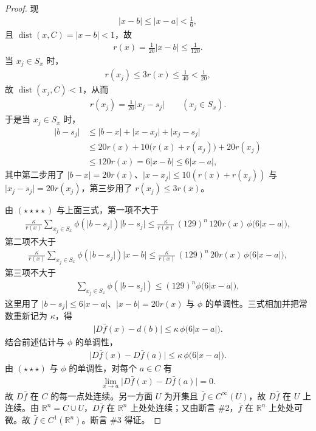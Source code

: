 \documentclass[../../main.tex]{subfiles}%
\begin{document}
\begin{proof}
现
\begin{align*}
\lvert x-b\rvert\leqslant\lvert x-a\rvert<\frac{1}{6},
\end{align*}
且 $\operatorname{dist}(x,C)=\lvert x-b\rvert<1$，故
\begin{align*}
r(x)=\frac{1}{20}\lvert x-b\rvert\leqslant\frac{1}{120}.
\end{align*}
当 $x_j\in S_x$ 时，
\begin{align*}
r(x_j)\leqslant3r(x)\leqslant\frac{1}{40}<\frac{1}{20},
\end{align*}
故 $\operatorname{dist}(x_j,C)<1$，从而
\begin{align*}
r(x_j)=\frac{1}{20}\lvert x_j-s_j\rvert\qquad(x_j\in S_x).
\end{align*}
于是当 $x_j\in S_x$ 时，
\begin{align*}
\lvert b-s_j\rvert&\leqslant\lvert b-x\rvert+\lvert x-x_j\rvert+\lvert x_j-s_j\rvert\\
&\leqslant20r(x)+10\bigl(r(x)+r(x_j)\bigr)+20r(x_j)\\
&\leqslant120r(x)=6\lvert x-b\rvert\leqslant6\lvert x-a\rvert,
\end{align*}
其中第二步用了 $\lvert b-x\rvert=20r(x)$、$\lvert x-x_j\rvert\leqslant10(r(x)+r(x_j))$ 与 $\lvert x_j-s_j\rvert=20r(x_j)$，第三步用了 $r(x_j)\leqslant3r(x)$。

由 $(\star\star\star\star)$ 与上面三式，第一项不大于
\begin{align*}
\frac{\kappa}{r(x)}\sum_{x_j\in S_x}\phi(\lvert b-s_j\rvert)\lvert b-s_j\rvert\leqslant\frac{\kappa}{r(x)}\,(129)^n\,120r(x)\,\phi\bigl(6\lvert x-a\rvert\bigr),
\end{align*}
第二项不大于
\begin{align*}
\frac{\kappa}{r(x)}\sum_{x_j\in S_x}\phi(\lvert b-s_j\rvert)\lvert x-b\rvert\leqslant\frac{\kappa}{r(x)}\,(129)^n\,20r(x)\,\phi\bigl(6\lvert x-a\rvert\bigr),
\end{align*}
第三项不大于
\begin{align*}
\sum_{x_j\in S_x}\phi(\lvert b-s_j\rvert)\leqslant(129)^n\phi\bigl(6\lvert x-a\rvert\bigr),
\end{align*}
这里用了 $\lvert b-s_j\rvert\leqslant6\lvert x-a\rvert$、$\lvert x-b\rvert=20r(x)$ 与 $\phi$ 的单调性。三式相加并把常数重新记为 $\kappa$，得
\begin{align*}
\lvert D\bar f(x)-d(b)\rvert\leqslant\kappa\,\phi\bigl(6\lvert x-a\rvert\bigr).
\end{align*}
结合前述估计与 $\phi$ 的单调性，
\begin{align*}
\lvert D\bar f(x)-D\bar f(a)\rvert\leqslant\kappa\,\phi\bigl(6\lvert x-a\rvert\bigr).
\end{align*}
由 $(\star\star\star)$ 与 $\phi$ 的单调性，对每个 $a\in C$ 有
\begin{align*}
\lim_{x\to a}\lvert D\bar f(x)-D\bar f(a)\rvert=0.
\end{align*}
故 $D\bar f$ 在 $C$ 的每一点处连续。另一方面 $U$ 为开集且 $\bar f\in C^{\infty}(U)$，故 $D\bar f$ 在 $U$ 上连续。由 $\mathbb{R}^n=C\cup U$，$D\bar f$ 在 $\mathbb{R}^n$ 上处处连续；又由断言 \#2，$\bar f$ 在 $\mathbb{R}^n$ 上处处可微。故 $\bar f\in C^1(\mathbb{R}^n)$。断言 \#3 得证。


\end{proof}
\end{document}
